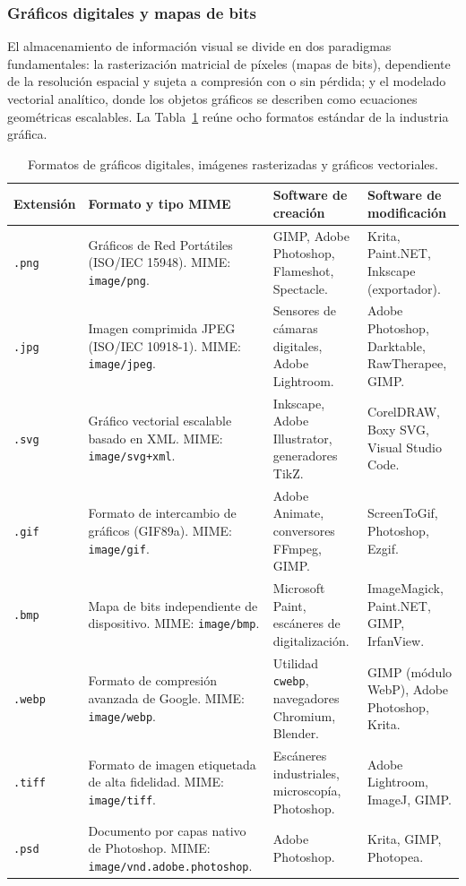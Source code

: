 \documentclass[12pt]{article}
\begin{document}
\subsubsection{Gráficos digitales y mapas de bits}
El almacenamiento de información visual se divide en dos paradigmas fundamentales: la rasterización matricial de píxeles (mapas de bits), dependiente de la resolución espacial y sujeta a compresión con o sin pérdida; y el modelado vectorial analítico, donde los objetos gráficos se describen como ecuaciones geométricas escalables. La Tabla~\ref{tab:formatosGraficos} reúne ocho formatos estándar de la industria gráfica.

\begin{table}[H]
\centering
\scriptsize
\renewcommand{\arraystretch}{0.95}
\renewcommand{\tabularxcolumn}[1]{m{#1}}
\setlength{\emergencystretch}{2em}
\caption{Formatos de gráficos digitales, imágenes rasterizadas y gráficos vectoriales.}
\label{tab:formatosGraficos}
\begin{tabularx}{\textwidth}{>{\centering\arraybackslash}m{1.8cm} X X X}
\toprule
\textbf{Extensión} & \textbf{Formato y tipo MIME} & \textbf{Software de creación} & \textbf{Software de modificación} \\
\midrule
\texttt{.png} & Gráficos de Red Portátiles (ISO/IEC 15948). MIME: \texttt{image/png}. & GIMP, Adobe Photoshop, Flameshot, Spectacle. & Krita, Paint.NET, Inkscape (exportador). \\
\texttt{.jpg} & Imagen comprimida JPEG (ISO/IEC 10918-1). MIME: \texttt{image/jpeg}. & Sensores de cámaras digitales, Adobe Lightroom. & Adobe Photoshop, Darktable, RawTherapee, GIMP. \\
\texttt{.svg} & Gráfico vectorial escalable basado en XML. MIME: \texttt{image/svg+xml}. & Inkscape, Adobe Illustrator, generadores TikZ. & CorelDRAW, Boxy SVG, Visual Studio Code. \\
\texttt{.gif} & Formato de intercambio de gráficos (GIF89a). MIME: \texttt{image/gif}. & Adobe Animate, conversores FFmpeg, GIMP. & ScreenToGif, Photoshop, Ezgif. \\
\texttt{.bmp} & Mapa de bits independiente de dispositivo. MIME: \texttt{image/bmp}. & Microsoft Paint, escáneres de digitalización. & ImageMagick, Paint.NET, GIMP, IrfanView. \\
\texttt{.webp} & Formato de compresión avanzada de Google. MIME: \texttt{image/webp}. & Utilidad \texttt{cwebp}, navegadores Chromium, Blender. & GIMP (módulo WebP), Adobe Photoshop, Krita. \\
\texttt{.tiff} & Formato de imagen etiquetada de alta fidelidad. MIME: \texttt{image/tiff}. & Escáneres industriales, microscopía, Photoshop. & Adobe Lightroom, ImageJ, GIMP. \\
\texttt{.psd} & Documento por capas nativo de Photoshop. MIME: \texttt{image/\allowbreak vnd.adobe.photoshop}. & Adobe Photoshop. & Krita, GIMP, Photopea. \\
\bottomrule
\end{tabularx}
\end{table}
\end{document}
